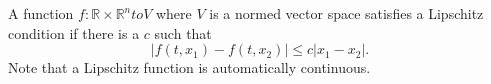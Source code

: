 A function  $ f :  \mathbb{R} \times \mathbb{R}^n to V $  where  $ V $  is a
normed vector space satisfies a Lipschitz condition if there is
a  $ c $  such that
 \[ |f(t,x_1)-f(t,x_2) | \leq c |x_1-x_2 |. \]  Note that a Lipschitz
function is automatically continuous.


